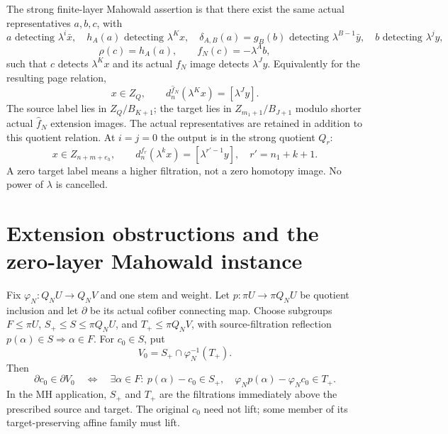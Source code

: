 \begin{definition}
The strong finite-layer Mahowald assertion is that there exist the same actual representatives $a,b,c$, with
\[
a\text{ detecting }\lambda^i\bar x,\quad h_A(a)\text{ detecting }\lambda^Kx,
\quad \delta_{A,B}(a)=g_B(b)\text{ detecting }\lambda^{B-1}\bar y,
\quad b\text{ detecting }\lambda^jy,
\]
\[
\rho(c)=h_A(a),\qquad f_N(c)=-\lambda^Ab,
\]
such that $c$ detects $\lambda^Kx$ and its actual $f_N$ image detects $\lambda^Jy$. Equivalently for the resulting page relation,
\[
x\in Z_Q,\qquad d_n^{\hat f_N}(\lambda^Kx)=[\lambda^Jy].
\]
The source label lies in $Z_Q/B_{K+1}$; the target lies in $Z_{m_1+1}/B_{J+1}$ modulo shorter actual $\hat f_N$ extension images. The actual representatives are retained in addition to this quotient relation. At $i=j=0$ the output is in the strong quotient $Q_r$:
\[
x\in Z_{n+m+e_h},\qquad d_n^{\hat f_r}(\lambda^kx)=[\lambda^{r'-1}y],\quad r'=n_1+k+1.
\]
A zero target label means a higher filtration, not a zero homotopy image. No power of $\lambda$ is cancelled.
\end{definition}

\section{Extension obstructions and the zero-layer Mahowald instance}

\begin{theorem}
\label{sem:ProofTools:mh-target-preserving-lift}
Fix $\varphi_N:Q_NU\to Q_NV$ and one stem and weight. Let $p:\pi U\to\pi Q_NU$ be quotient inclusion and let $\partial$ be its actual cofiber connecting map. Choose subgroups $F\leq\pi U$, $S_+\leq S\leq\pi Q_NU$, and $T_+\leq\pi Q_NV$, with source-filtration reflection $p(\alpha)\in S\Rightarrow\alpha\in F$. For $c_0\in S$, put
\[V_0=S_+\cap\varphi_N^{-1}(T_+).\]
Then
\[
\partial c_0\in\partial V_0
\quad\Longleftrightarrow\quad
\exists\alpha\in F:\ p(\alpha)-c_0\in S_+,\quad
\varphi_Np(\alpha)-\varphi_Nc_0\in T_+.
\]
In the MH application, $S_+$ and $T_+$ are the filtrations immediately above the prescribed source and target. The original $c_0$ need not lift; some member of its target-preserving affine family must lift.
\end{theorem}

